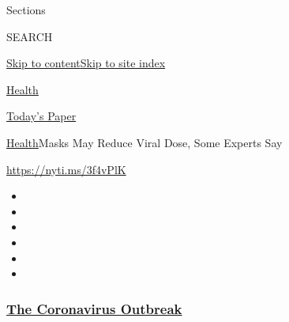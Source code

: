 Sections

SEARCH

\protect\hyperlink{site-content}{Skip to
content}\protect\hyperlink{site-index}{Skip to site index}

\href{https://www.nytimes3xbfgragh.onion/section/health}{Health}

\href{https://myaccount.nytimes3xbfgragh.onion/auth/login?response_type=cookie\&client_id=vi}{}

\href{https://www.nytimes3xbfgragh.onion/section/todayspaper}{Today's
Paper}

\href{/section/health}{Health}\textbar{}Masks May Reduce Viral Dose,
Some Experts Say

\url{https://nyti.ms/3f4vPlK}

\begin{itemize}
\item
\item
\item
\item
\item
\item
\end{itemize}

\hypertarget{the-coronavirus-outbreak}{%
\subsubsection{\texorpdfstring{\href{https://www.nytimes3xbfgragh.onion/news-event/coronavirus?name=styln-coronavirus-national\&region=TOP_BANNER\&variant=undefined\&block=storyline_menu_recirc\&action=click\&pgtype=Article\&impression_id=e741d190-e3a9-11ea-9f52-e335c4ed056e}{The
Coronavirus
Outbreak}}{The Coronavirus Outbreak}}\label{the-coronavirus-outbreak}}

